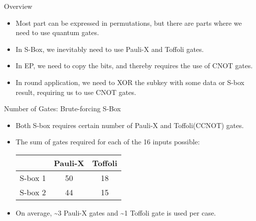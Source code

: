 \documentclass{beamer}
\begin{document}
	\begin{frame}{Overview}
		\begin{itemize}
			\item Most part can be expressed in permutations, but there are parts where we need to use quantum gates.
			\item In S-Box, we inevitably need to use Pauli-X and Toffoli gates.
			\item In EP, we need to copy the bits, and thereby requires the use of CNOT gates.
			\item In round application, we need to XOR the subkey with some data or S-box result, requiring us to use CNOT gates.
		\end{itemize}
	\end{frame}
	
	\begin{frame}{Number of Gates: Brute-forcing S-Box}
		\begin{itemize}
			\item Both S-box requires certain number of Pauli-X and Toffoli(CCNOT) gates.
			\item The sum of gates required for each of the 16 inputs possible:
			\begin{center}
				\begin{tabular}{c|c|c}
					        & Pauli-X & Toffoli \\\hline
					S-box 1 & 50      & 18      \\\hline
					S-box 2 & 44      & 15
				\end{tabular}
			\end{center}
			\item On average, \textasciitilde3 Pauli-X gates and \textasciitilde1 Toffoli gate is used per case.
		\end{itemize}
	\end{frame}
	
\end{document}
